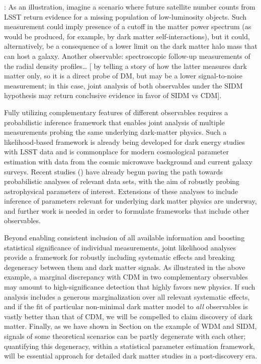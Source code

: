 : As an illustration, imagine a scenario where future satellite number counts from LSST return evidence for a missing population of low-luminosity objects. 
Such measurement could imply presence of a cutoff in the matter power spectrum (as would be produced, for example, by dark matter self-interactions), but it could, alternatively, be a consequence of a lower limit on the dark matter halo mass that can host a galaxy. 
Another observable: spectroscopic follow-up measurements of the radial density profiles… [ by telling a story of how the latter measures dark matter only, so it is a direct probe of DM, but may be a lower signal-to-noise measurement; in this case, joint analysis of both observables under the SIDM hypothesis may return conclusive evidence in favor of SIDM vs CDM].

Fully utilizing complementary features of different observables requires a probabilistic inference framework that enables joint analysis of multiple measurements probing the same underlying dark-matter physics. 
Such a likelihood-based framework is already being developed for dark energy studies with LSST data and is commonplace for modern cosmological parameter estimation with data from the cosmic microwave background and current galaxy surveys. 
Recent studies () have already begun paving the path towards probabilistic analyses of relevant data sets, with the aim of robustly probing astrophysical parameters of interest. 
Extensions of these analyses to include inference of parameters relevant for underlying dark matter physics are underway, and further work is needed in order to formulate frameworks that include other observables. 

Beyond enabling consistent inclusion of all available information and boosting statistical significance of individual measurements, joint likelihood analyses provide a framework for robustly including systematic effects and breaking degeneracy between them and dark matter signals. 
As illustrated in the above example, a marginal discrepancy with CDM in two complementary observables may amount to high-significance detection that highly favors new physics. 
If such analysis includes a generous marginalization over all relevant systematic effects, and if the fit of particular non-minimal dark matter model to \textit{all} observables is vastly better than that of CDM, we will be compelled to claim discovery of dark matter. 
Finally, as we have shown in Section  on the example of WDM and SIDM, signals of some theoretical scenarios can be partly degenerate with each other; quantifying this degeneracy, within a statistical parameter estimation framework, will be essential approach for detailed dark matter studies in a post-discovery era.

